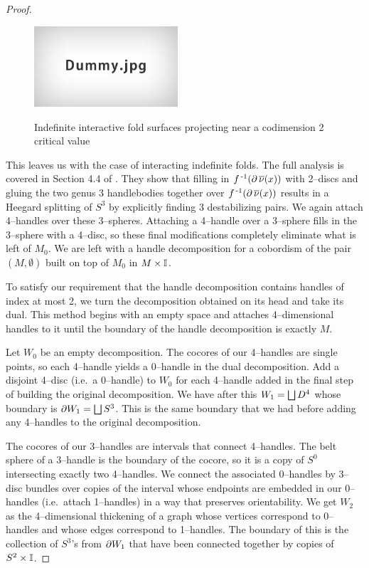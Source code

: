 \begin{proof}
	\begin{figure}
		\centering
		\caption{Indefinite interactive fold surfaces projecting near a codimension 2 critical value}
		\includegraphics[height=3cm]{figures/dummy.jpg}
		\label{fig:interactivefoldprojcodim2}		
	\end{figure}
	
	This leaves us with the case of interacting indefinite folds.
	The full analysis is covered in Section 4.4 of \cite{CostThur08}.
	They show that filling in $f^{\,\text{-}1}(\partial\,\overline{\nu}(x))$ with 2--discs and gluing the two genus 3 handlebodies together over $f^{\,\text{-}1}(\partial\,\overline{\nu}(x))$ results in a Heegard splitting of $S^3$ by explicitly finding 3 destabilizing pairs.
	We again attach 4--handles over these 3--spheres.
	Attaching a 4--handle over a 3--sphere fills in the 3--sphere with a 4--disc, so these final modifications completely eliminate what is left of $M_0$.
	We are left with a handle decomposition for a cobordism of the pair $(M,\emptyset)$ built on top of $M_0$ in $M\times\mathbb{I}$.

	To satisfy our requirement that the handle decomposition contains handles of index at most 2, we turn the decomposition obtained on its head and take its dual.
	This method begins with an empty space and attaches 4--dimensional handles to it until the boundary of the handle decomposition is exactly $M$.
	
	Let $W_0$ be an empty decomposition.
	The cocores of our 4--handles are single points, so each 4--handle yields a 0--handle in the dual decomposition.
	Add a disjoint 4--disc (i.e.\ a 0--handle) to $W_0$ for each 4--handle added in the final step of building the original decomposition.
	We have after this $W_1=\bigsqcup D^4$ whose boundary is $\partial W_1 = \bigsqcup S^3$.
	This is the same boundary that we had before adding any 4--handles to the original decomposition.
	
	The cocores of our 3--handles are intervals that connect 4--handles.
	The belt sphere of a 3--handle is the boundary of the cocore, so it is a copy of $S^0$ intersecting exactly two 4--handles.
	We connect the associated 0--handles by 3--disc bundles over copies of the interval whose endpoints are embedded in our 0--handles (i.e.\ attach 1--handles) in a way that preserves orientability.
	We get $W_2$ as the 4--dimensional thickening of a graph whose vertices correspond to 0--handles and whose edges correspond to 1--handles.
	The boundary of this is the collection of $S^3$'s from $\partial W_1$ that have been connected together by copies of $S^2\times\mathbb{I}$.


\end{proof}
